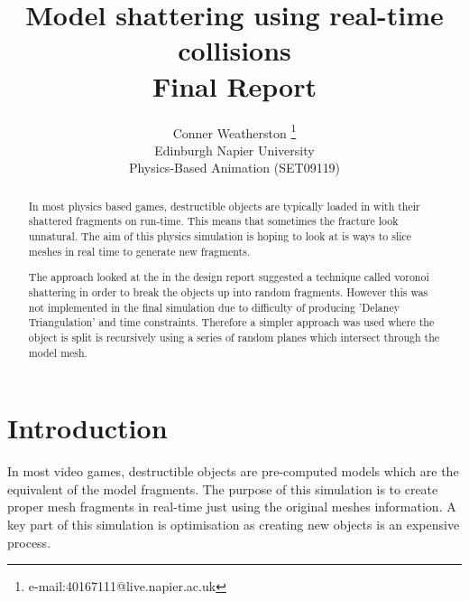 \documentclass[conference,backref=page]{acmsiggraph}
\title{Model shattering using real-time collisions\\
	   Final Report}
\author{Conner Weatherston \thanks{e-mail:40167111@live.napier.ac.uk} \\
Edinburgh Napier University\\
Physics-Based Animation (SET09119)}
\begin{document}

\maketitle

\raggedbottom

\begin{abstract}
In most physics based games, destructible objects are typically loaded in with their shattered fragments on run-time. This means that sometimes the fracture look unnatural. The aim of this physics simulation is hoping to look at is ways to slice meshes in real time to generate new fragments.

The approach looked at the in the design report suggested a technique called voronoi shattering in order to break the objects up into random fragments. However this was not implemented in the final simulation due to difficulty of producing 'Delaney Triangulation' and time constraints. Therefore a simpler approach was used where the object is split is recursively using a series of random planes which intersect through the model mesh.

\end{abstract}



\keywordlist


\section{Introduction}

In most video games, destructible objects are pre-computed models which are the equivalent of the model fragments. The purpose of this simulation is to create proper mesh fragments in real-time just using the original meshes information. A key part of this simulation is optimisation as creating new objects is an expensive process.
\end{document}
